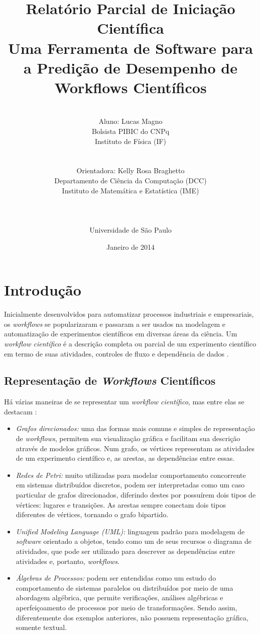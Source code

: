 \documentclass[a4paper,11pt]{article}
\date{\vfill Janeiro de 2014}
\title{
	Relatório Parcial de Iniciação Científica \vspace{40pt}\\ 
	Uma Ferramenta de Software para a Predição de Desempenho de Workflows Científicos
}
\author{
	\vspace{100pt}\\
	Aluno: Lucas Magno \\ 
	Bolsista PIBIC do CNPq \\
	Instituto de Física (IF) \\
	\\ \\
	Orientadora: Kelly Rosa Braghetto\\ 
	Departamento de Ciência da Computação (DCC) \\ 
	Instituto de Matemática e Estatística (IME) \\
	\\ \\ \\
	Universidade de São Paulo
}
\begin{document}
  \maketitle
  \thispagestyle{empty}
  \newpage
  \clearpage
  \setcounter{page}{1}
  \tableofcontents
  \newpage

  \section{Introdução}
  	Inicialmente desenvolvidos para automatizar processos industriais e empresariais, os \emph{workflows} se popularizaram e passaram a ser usados na modelagem e automatização de experimentos científicos em diversas áreas da ciência. Um \emph{workflow científico} é a descrição completa ou parcial de um experimento científico em termo de suas atividades, controles de fluxo e dependência de dados \cite{phd:gadelha12}. 

  	\subsection{Representação de \emph{Workflows} Científicos}
  	Há várias maneiras de se representar um \emph{workflow científico}, mas entre elas se destacam \cite{phd:oga11}:

  	\begin{itemize}
  		\item \emph{Grafos direcionados:} uma das formas mais comuns e simples de representação de \emph{workflows}, permitem sua visualização gráfica e facilitam sua descrição através de modelos gráficos. Num grafo, os vértices representam as atividades de um experimento científico e, as arestas, as dependências entre essas.

  		\item \emph{Redes de Petri:} muito utilizadas para modelar comportamento concorrente em sistemas distribuídos discretos, podem ser interpretadas como um caso particular de grafos direcionados, diferindo destes por possuírem dois tipos de vértices: lugares e transições. As arestas sempre conectam dois tipos diferentes de vértices, tornando o grafo bipartido.

  		\item \emph{\emph{Unified Modeling Language} (UML):} linguagem padrão para modelagem de \emph{software} orientado a objetos, tendo como um de seus recursos o diagrama de atividades, que pode ser utilizado para descrever as dependências entre atividades e, portanto, \emph{workflows}. 

  		\item \emph{Álgebras de Processos:} podem ser entendidas como um estudo do comportamento de sistemas paralelos ou distribuídos por meio de uma abordagem algébrica, que permite verificações, análises algébricas e aperfeiçoamento de processos por meio de transformações. Sendo assim, diferentemente dos exemplos anteriores, não possuem representação gráfica, somente textual.
 		
  	\end{itemize}
\end{document}
